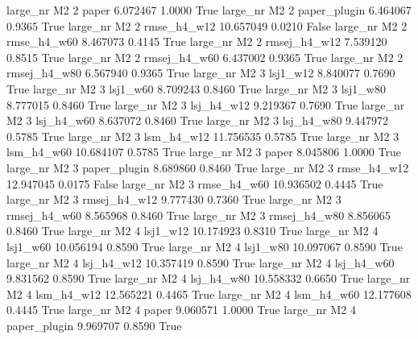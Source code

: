   large_nr       M2                 2        paper    6.072467      1.0000    True
  large_nr       M2                 2 paper_plugin    6.464067      0.9365    True
  large_nr       M2                 2  rmse_h4_w12   10.657049      0.0210   False
  large_nr       M2                 2  rmse_h4_w60    8.467073      0.4145    True
  large_nr       M2                 2 rmsej_h4_w12    7.539120      0.8515    True
  large_nr       M2                 2 rmsej_h4_w60    6.437002      0.9365    True
  large_nr       M2                 2 rmsej_h4_w80    6.567940      0.9365    True
  large_nr       M2                 3     lsj1_w12    8.840077      0.7690    True
  large_nr       M2                 3     lsj1_w60    8.709243      0.8460    True
  large_nr       M2                 3     lsj1_w80    8.777015      0.8460    True
  large_nr       M2                 3   lsj_h4_w12    9.219367      0.7690    True
  large_nr       M2                 3   lsj_h4_w60    8.637072      0.8460    True
  large_nr       M2                 3   lsj_h4_w80    9.447972      0.5785    True
  large_nr       M2                 3   lsm_h4_w12   11.756535      0.5785    True
  large_nr       M2                 3   lsm_h4_w60   10.684107      0.5785    True
  large_nr       M2                 3        paper    8.045806      1.0000    True
  large_nr       M2                 3 paper_plugin    8.689860      0.8460    True
  large_nr       M2                 3  rmse_h4_w12   12.947045      0.0175   False
  large_nr       M2                 3  rmse_h4_w60   10.936502      0.4445    True
  large_nr       M2                 3 rmsej_h4_w12    9.777430      0.7360    True
  large_nr       M2                 3 rmsej_h4_w60    8.565968      0.8460    True
  large_nr       M2                 3 rmsej_h4_w80    8.856065      0.8460    True
  large_nr       M2                 4     lsj1_w12   10.174923      0.8310    True
  large_nr       M2                 4     lsj1_w60   10.056194      0.8590    True
  large_nr       M2                 4     lsj1_w80   10.097067      0.8590    True
  large_nr       M2                 4   lsj_h4_w12   10.357419      0.8590    True
  large_nr       M2                 4   lsj_h4_w60    9.831562      0.8590    True
  large_nr       M2                 4   lsj_h4_w80   10.558332      0.6650    True
  large_nr       M2                 4   lsm_h4_w12   12.565221      0.4465    True
  large_nr       M2                 4   lsm_h4_w60   12.177608      0.4445    True
  large_nr       M2                 4        paper    9.060571      1.0000    True
  large_nr       M2                 4 paper_plugin    9.969707      0.8590    True
